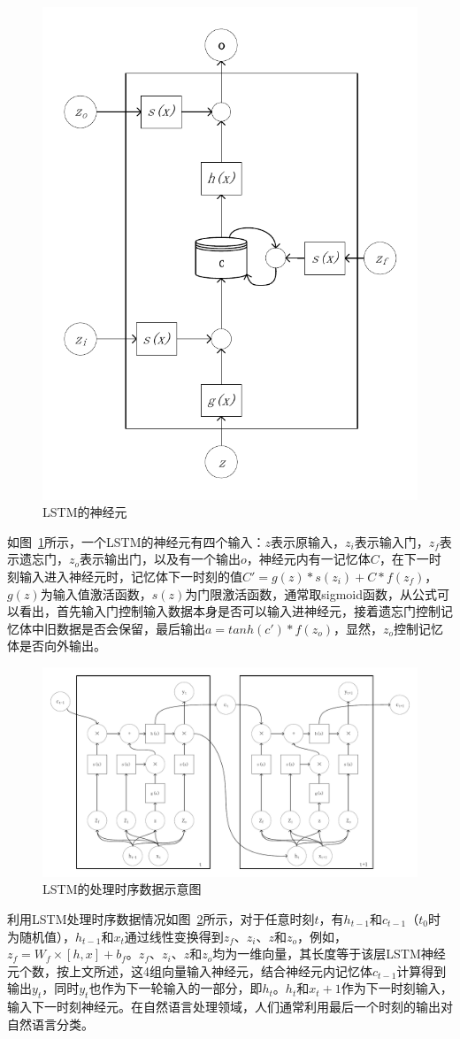 \begin{figure}[htb]
	\centering
	\includegraphics[width=0.4\linewidth]{FIGs/chapter2/lstm_cell.pdf}
	\caption{LSTM的神经元}\label{lstmcell}
\end{figure}
如图~\ref{lstmcell}所示，一个LSTM的神经元有四个输入：$z$表示原输入，$z_i$表示输入门，$z_f$表示遗忘门，$z_o$表示输出门，以及有一个输出$o$，神经元内有一记忆体$C$，在下一时刻输入进入神经元时，记忆体下一时刻的值$C'=g(z)*s(z_i)+C*f(z_f)$，$g(z)$为输入值激活函数，$s(z)$为门限激活函数，通常取sigmoid函数，从公式可以看出，首先输入门控制输入数据本身是否可以输入进神经元，接着遗忘门控制记忆体中旧数据是否会保留，最后输出$a=tanh(c')*f(z_o)$，显然，$z_o$控制记忆体是否向外输出。

\begin{figure}[htb]
	\centering
	\includegraphics[width=0.8\linewidth]{FIGs/chapter2/lstm_time.pdf}
	\caption{LSTM的处理时序数据示意图}\label{lstmtime}
\end{figure}

利用LSTM处理时序数据情况如图~\ref{lstmtime}所示，对于任意时刻$t$，有$h_{t-1}$和$c_{t-1}$（$t_0$时为随机值），$h_{t-1}$和$x_t$通过线性变换得到$z_f$、$z_i$、$z$和$z_o$，例如，$z_f=W_{f}\times [h,x]+b_{f}$。$z_f$、$z_i$、$z$和$z_o$均为一维向量，其长度等于该层LSTM神经元个数，按上文所述，这4组向量输入神经元，结合神经元内记忆体$c_{t-1}$计算得到输出$y_t$，同时$y_t$也作为下一轮输入的一部分，即$h_t$。$h_t$和$x_t+1$作为下一时刻输入，输入下一时刻神经元。在自然语言处理领域，人们通常利用最后一个时刻的输出对自然语言分类。

